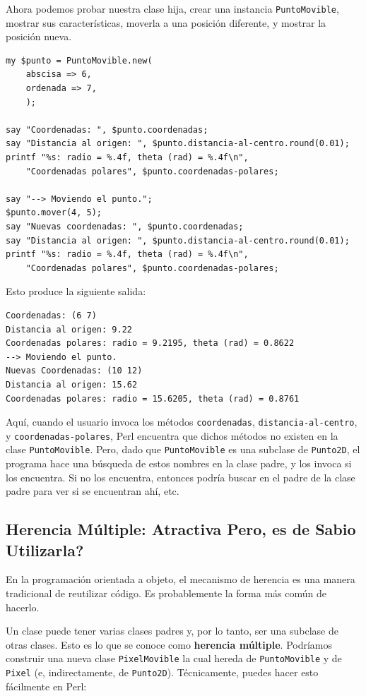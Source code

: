 Ahora podemos probar nuestra clase hija, crear una instancia 
{\tt PuntoMovible}, mostrar sus características, moverla a una
posición diferente, y mostrar la posición nueva. 

\begin{lstlisting}
my $punto = PuntoMovible.new(
    abscisa => 6,
    ordenada => 7,
    );

say "Coordenadas: ", $punto.coordenadas;
say "Distancia al origen: ", $punto.distancia-al-centro.round(0.01);
printf "%s: radio = %.4f, theta (rad) = %.4f\n", 
    "Coordenadas polares", $punto.coordenadas-polares;

say "--> Moviendo el punto.";
$punto.mover(4, 5);
say "Nuevas coordenadas: ", $punto.coordenadas;
say "Distancia al origen: ", $punto.distancia-al-centro.round(0.01);
printf "%s: radio = %.4f, theta (rad) = %.4f\n", 
    "Coordenadas polares", $punto.coordenadas-polares;
\end{lstlisting}

Esto produce la siguiente salida:

\begin{lstlisting}
Coordenadas: (6 7)
Distancia al origen: 9.22
Coordenadas polares: radio = 9.2195, theta (rad) = 0.8622
--> Moviendo el punto.
Nuevas Coordenadas: (10 12)
Distancia al origen: 15.62
Coordenadas polares: radio = 15.6205, theta (rad) = 0.8761
\end{lstlisting}

Aquí, cuando el usuario invoca los métodos {\tt coordenadas},
{\tt distancia-al-centro}, y {\tt coordenadas-polares}, Perl
encuentra que dichos métodos no existen en la clase {\tt PuntoMovible}.
Pero, dado que \verb|PuntoMovible| es una subclase de {\tt Punto2D},
el programa hace una búsqueda de estos nombres en la clase padre, 
y los invoca si los encuentra. Si no los encuentra, entonces podría
buscar en el padre de la clase padre para ver si se encuentran ahí, etc.


\subsection{Herencia Múltiple: Atractiva Pero, es de Sabio Utilizarla?}

En la programación orientada a objeto, el mecanismo de herencia
es una manera tradicional de reutilizar código. Es probablemente 
la forma más común de hacerlo.

Un clase puede tener varias clases padres y, por lo tanto,
ser una subclase de otras clases. Esto es lo que se conoce como
{\bf herencia múltiple}. Podríamos construir una nueva 
clase {\tt PixelMovible} la cual hereda de {\tt PuntoMovible} 
y de {\tt Pixel} (e, indirectamente, de {\tt Punto2D}). Técnicamente,
puedes hacer esto fácilmente en Perl:

